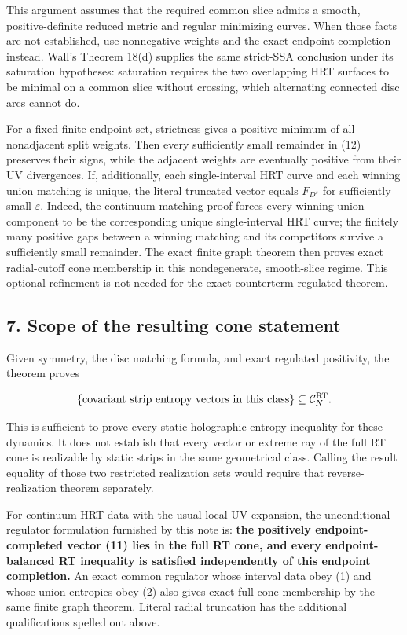 \documentclass[11pt]{article}
\begin{document}
This argument assumes that the required common slice admits a smooth,
positive-definite reduced metric and regular minimizing curves. When
those facts are not established, use nonnegative weights and the exact
endpoint completion instead. Wall's Theorem 18(d) supplies the same
strict-SSA conclusion under its saturation hypotheses: saturation
requires the two overlapping HRT surfaces to be minimal on a common
slice without crossing, which alternating connected disc arcs cannot do.

For a fixed finite endpoint set, strictness gives a positive minimum of
all nonadjacent split weights. Then every sufficiently small remainder
in (12) preserves their signs, while the adjacent weights are eventually
positive from their UV divergences. If, additionally, each
single-interval HRT curve and each winning union matching is unique, the
literal truncated vector equals \(F_{D^\varepsilon}\) for sufficiently
small \(\varepsilon\). Indeed, the continuum matching proof forces every
winning union component to be the corresponding unique single-interval
HRT curve; the finitely many positive gaps between a winning matching
and its competitors survive a sufficiently small remainder. The exact
finite graph theorem then proves exact radial-cutoff cone membership in
this nondegenerate, smooth-slice regime. This optional refinement is not
needed for the exact counterterm-regulated theorem.

\subsection{7. Scope of the resulting cone
statement}\label{scope-of-the-resulting-cone-statement}

Given symmetry, the disc matching formula, and exact regulated
positivity, the theorem proves

\[
\{\text{covariant strip entropy vectors in this class}\}
\subseteq\mathcal C_N^{\rm RT}.
\]

This is sufficient to prove every static holographic entropy inequality
for these dynamics. It does not establish that every vector or extreme
ray of the full RT cone is realizable by static strips in the same
geometrical class. Calling the result equality of those two restricted
realization sets would require that reverse-realization theorem
separately.

For continuum HRT data with the usual local UV expansion, the
unconditional regulator formulation furnished by this note is:
\textbf{the positively endpoint-completed vector (11) lies in the full
RT cone, and every endpoint-balanced RT inequality is satisfied
independently of this endpoint completion.} An exact common regulator
whose interval data obey (1) and whose union entropies obey (2) also
gives exact full-cone membership by the same finite graph theorem.
Literal radial truncation has the additional qualifications spelled out
above.
\end{document}
